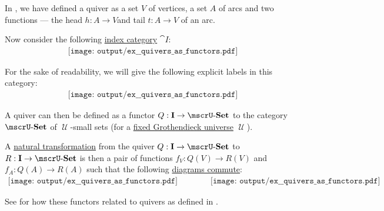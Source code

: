 \begin{example}\label{ex:quivers_as_functors}
  In , we have defined a quiver as a set \( V \) of vertices, a set \( A \) of arcs and two functions --- the head \( h: A \to V \)and tail \( t: A \to V \) of an arc.

  Now consider the following \hyperref[def:categorical_diagram]{index category} \( \cat{I}: \)
  \begin{equation}\label{eq:ex:quivers_as_functors/index/dots}
    \begin{aligned}
      \texttt{[image: output/ex\_\_quivers\_as\_functors.pdf]}
    \end{aligned}
  \end{equation}

  For the sake of readability, we will give the following explicit labels in this category:
  \begin{equation}\label{eq:ex:quivers_as_functors/index/annotated}
    \begin{aligned}
      \texttt{[image: output/ex\_\_quivers\_as\_functors.pdf]}
    \end{aligned}
  \end{equation}

  A quiver can then be defined as a functor \( Q: \cat{I} \to \ucat{Set} \) to the category \hyperref[def:category_of_small_sets]{\( \ucat{Set} \)} of \( \mscrU \)-small sets (for a \hyperref[def:category_size]{fixed Grothendieck universe} \( \mscrU \)).

  A \hyperref[def:natural_transformation]{natural transformation} from the quiver \( Q: \cat{I} \to \ucat{Set} \) to \( R: \cat{I} \to \ucat{Set} \) is then a pair of functions \( f_V: Q(V) \to R(V) \) and \( f_A: Q(A) \to R(A) \) such that the following \hyperref[def:categorical_diagram]{diagrams commute}:
  \begin{equation}\label{eq:ex:quivers_as_functors/index/diagram}
    \begin{aligned}
      \texttt{[image: output/ex\_\_quivers\_as\_functors.pdf]}
      \quad\quad\quad\quad
      \texttt{[image: output/ex\_\_quivers\_as\_functors.pdf]}
    \end{aligned}
  \end{equation}

  See  for how these functors related to quivers as defined in .
\end{example}

